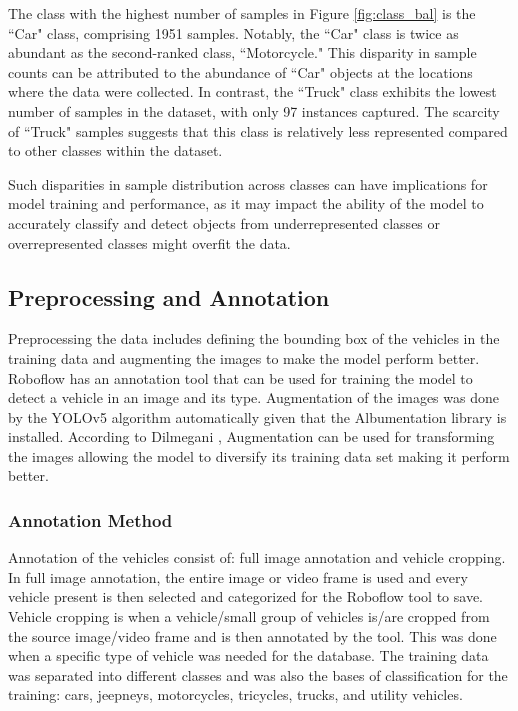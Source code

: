The class with the highest number of samples in Figure \ref{fig:class_bal} is the ``Car" class, comprising 1951 samples. Notably, the ``Car" class is twice as abundant as the second-ranked class, ``Motorcycle." This disparity in sample counts can be attributed to the abundance of ``Car" objects at the locations where the data were collected.
In contrast, the ``Truck" class exhibits the lowest number of samples in the dataset, with only 97 instances captured. The scarcity of ``Truck" samples suggests that this class is relatively less represented compared to other classes within the dataset.

Such disparities in sample distribution across classes can have implications for model training and performance, as it may impact the ability of the model to accurately classify and detect objects from underrepresented classes or overrepresented classes might overfit the data.



\subsection {Preprocessing and Annotation}

	Preprocessing the data includes defining the bounding box of the vehicles in the training data and augmenting the images to make the model perform better. Roboflow has an annotation tool that can be used for  training the model to detect a vehicle in an image and its type. Augmentation of the images was done by the YOLOv5 algorithm automatically given that the Albumentation library is installed. According to Dilmegani \citeyear{dilmegani}, Augmentation can be used for transforming the images allowing the model to diversify its training data set making it perform better.
	

	
\subsubsection{Annotation Method}
Annotation of the vehicles consist of: full image annotation and vehicle cropping. In full image annotation, the entire image or video frame is used and every vehicle present is then selected and categorized for the Roboflow tool to save. Vehicle cropping is when a vehicle/small group of vehicles is/are cropped from the source image/video frame and is then annotated by the tool. This was done when a specific type of vehicle was needed for the database. The training data was separated into different classes and was also the bases of classification for the training: cars, jeepneys, motorcycles, tricycles, trucks, and utility vehicles. 

